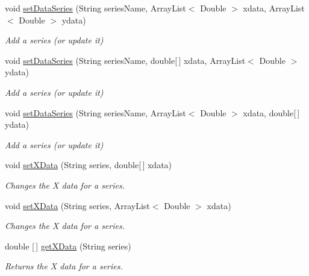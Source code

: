 \begin{DoxyCompactItemize}
void \mbox{\hyperlink{classbridges_1_1base_1_1_line_chart_ab3b577798d421da8d8519d73dcf7ceaf}{set\+Data\+Series}} (String series\+Name, Array\+List$<$ Double $>$ xdata, Array\+List$<$ Double $>$ ydata)
\begin{DoxyCompactList}\small\item\em Add a series (or update it) \end{DoxyCompactList}\item 
void \mbox{\hyperlink{classbridges_1_1base_1_1_line_chart_ac650a150cfbf2e572a5ccdb5d25cb00b}{set\+Data\+Series}} (String series\+Name, double\mbox{[}$\,$\mbox{]} xdata, Array\+List$<$ Double $>$ ydata)
\begin{DoxyCompactList}\small\item\em Add a series (or update it) \end{DoxyCompactList}\item 
void \mbox{\hyperlink{classbridges_1_1base_1_1_line_chart_a38eb16930491bc047a5343dd73052219}{set\+Data\+Series}} (String series\+Name, Array\+List$<$ Double $>$ xdata, double\mbox{[}$\,$\mbox{]} ydata)
\begin{DoxyCompactList}\small\item\em Add a series (or update it) \end{DoxyCompactList}\item 
void \mbox{\hyperlink{classbridges_1_1base_1_1_line_chart_a2918179283e8280d47abb43df3c59195}{set\+X\+Data}} (String series, double\mbox{[}$\,$\mbox{]} xdata)
\begin{DoxyCompactList}\small\item\em Changes the X data for a series. \end{DoxyCompactList}\item 
void \mbox{\hyperlink{classbridges_1_1base_1_1_line_chart_a2f141ec46fdafd92fb0d86900a2de46a}{set\+X\+Data}} (String series, Array\+List$<$ Double $>$ xdata)
\begin{DoxyCompactList}\small\item\em Changes the X data for a series. \end{DoxyCompactList}\item 
double \mbox{[}$\,$\mbox{]} \mbox{\hyperlink{classbridges_1_1base_1_1_line_chart_a34ef6ace0633d287a78d0e224f38f2ed}{get\+X\+Data}} (String series)
\begin{DoxyCompactList}\small\item\em Returns the X data for a series. \end{DoxyCompactList}\item 

\end{DoxyCompactItemize}
